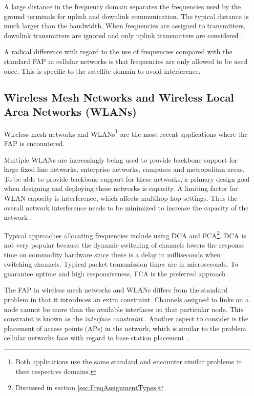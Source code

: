  A large distance in the frequency domain separates the frequencies used by the ground terminals for uplink and downlink communication. The typical distance is much larger than the bandwidth. When frequencies are assigned to transmitters, downlink transmitters are ignored and only uplink transmitters are considered \cite{Karen2004}. 

A radical difference with regard to the use of frequencies compared with the standard FAP in cellular networks is that frequencies are only allowed to be used once\cite{Karen2004}. This is specific to the satellite domain to avoid interference\cite{Karen2004}.

\subsection{Wireless Mesh Networks and Wireless Local Area Networks (WLANs)}
Wireless mesh networks and WLANs\footnote{Both applications use the same standard and encounter similar problems in their respective domains.} are the most recent applications where the FAP is encountered. 

Multiple WLANs are increasingly being used to provide backbone support for large fixed line networks, enterprise networks, campuses and metropolitan areas\cite{MultiradioMeshNetworks}. To be able to provide backbone support for these networks, a primary design goal when designing and deploying these networks is capacity\cite{MultiradioMeshNetworks}. A limiting factor for WLAN capacity is interference, which affects multihop hop settings. Thus the overall network interference needs to be minimized to increase the capacity of the network \cite{MultiradioMeshNetworks}. 

Typical approaches allocating frequencies include using DCA and FCA\footnote{Discussed in section \ref{sec:FreqAssignmentTypes}}. DCA is not very popular because the dynamic switching of channels lowers the response time on commodity hardware since there is a delay in milliseconds when switching channels. Typical packet transmission times are in microseconds. To guarantee uptime and high responsiveness, FCA is the preferred approach \cite{MultiradioMeshNetworks}.

The FAP in wireless mesh networks and WLANs differs from the standard problem in that it introduces an extra constraint. Channels assigned to links on a node cannot be more than the available interfaces on that particular node. This constraint is known as the \emph{interface constraint} \cite{MultiradioMeshNetworks}. Another aspect to consider is the placement of access points (APs) in the network, which is similar to the problem cellular networks face with regard to base station placement \cite{Karen2004}.

